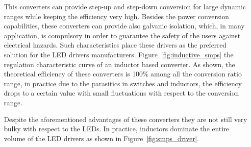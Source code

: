 This converters can provide step-up and step-down conversion for large dynamic ranges while keeping the efficiency very high. Besides the power conversion capabilities, these converters can provide also galvanic isolation, which, in many application, is compulsory in order to guarantee the safety of the users against electrical hazards. Such characteristics place these drivers as the preferred solution for the LED drivers manufacturers. Figure~\ref{fig:inductive_smps} the regulation characteristic curve of an inductor based converter. As shown, the theoretical efficiency of these converters is 100\% among all the conversion ratio range, in practice due to the parasitics in switches and inductors, the efficiency drops to a certain value with small fluctuations with respect to the conversion range.

Despite the aforementioned advantages of these converters they are not still very bulky with respect to the LEDs.  In practice, inductors dominate the entire volume of the LED drivers as shown in Figure~\ref{fig:smps_driver}.

